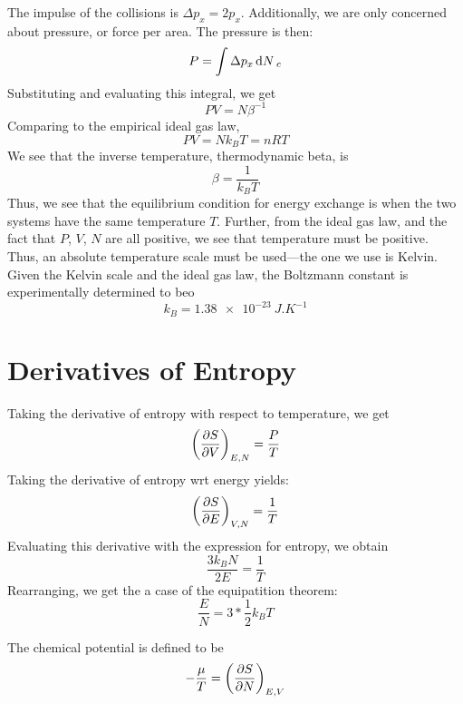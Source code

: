 The impulse of the collisions is \(\Delta p_x = 2 p_x\). Additionally, we are only concerned about pressure, or force per area. The pressure is then:
\begin{equation}
	P = \int\Delta p_x\d{N}_c
\end{equation}
Substituting and evaluating this integral, we get
\begin{equation}
	PV=N\beta^{-1}
\end{equation}
Comparing to the empirical ideal gas law,
\begin{equation}
	PV=Nk_B T=nRT
\end{equation}
We see that the inverse temperature, thermodynamic beta, is
\begin{equation}
	\beta = \frac{1}{k_B T}
\end{equation}
Thus, we see that the equilibrium condition for energy exchange is when the two systems have the same temperature \(T\). Further, from the ideal gas law, and the fact that \(P\), \(V\), \(N\) are all positive, we see that temperature must be positive. Thus, an absolute temperature scale must be used---the one we use is Kelvin. Given the Kelvin scale and the ideal gas law, the Boltzmann constant is experimentally determined to beo 
\begin{equation}
	k_B=\SI{1.38e-23}{J.K^{-1}}
\end{equation}

\section{Derivatives of Entropy}
Taking the derivative of entropy with respect to temperature, we get 
\begin{equation}
	\left(\frac{\partial S}{\partial V}\right)_{E,N}=\frac{P}{T}
\end{equation}
Taking the derivative of entropy wrt energy yields:
\begin{equation}
	\left(\frac{\partial S}{\partial E}\right)_{V,N}=\frac{1}{T}
\end{equation}
Evaluating this derivative with the expression for entropy, we obtain
\[\frac{3k_B N}{2E} = \frac{1}{T}\]
Rearranging, we get the a case of the equipatition theorem:
\begin{equation}
	\frac{E}{N}=3*\frac{1}{2}k_B T
\end{equation}

The chemical potential is defined to be
\begin{equation}
	-\frac{\mu}{T} = \left(\frac{\partial S}{\partial N}\right)_{E,V}
\end{equation}

